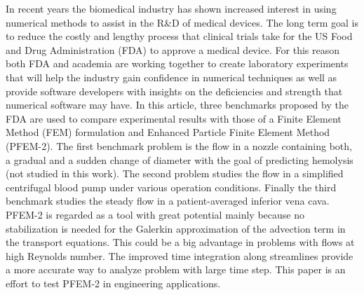 In recent years the biomedical industry has shown increased interest in using numerical methods to assist in the R\&D of medical devices. The long term goal is to reduce the costly and lengthy process that clinical trials take for the US Food and Drug Administration (FDA) to approve a medical device. For this reason both FDA and academia are working together to create laboratory experiments that will help the industry gain confidence in numerical techniques as well as provide software developers with insights on the deficiencies and strength that numerical software may have. In this article, three benchmarks proposed by the FDA are used to compare experimental results with those of a Finite Element Method (FEM) formulation and Enhanced Particle Finite Element Method (PFEM-2). The first benchmark problem is the flow in a nozzle
containing both, a gradual and a sudden change of diameter with the goal of predicting hemolysis (not studied in this work). The second problem studies the flow in a simplified centrifugal
blood pump under various operation conditions. Finally the third benchmark studies the steady flow in a patient-averaged inferior vena cava. PFEM-2 is regarded as a tool with great potential mainly because no stabilization is needed for the Galerkin approximation of the advection term in the transport equations. This could be a big advantage in problems with flows at high Reynolds number. The improved time integration along streamlines provide a more accurate way to analyze problem with large time step. This paper is an effort to test PFEM-2 in engineering applications.
